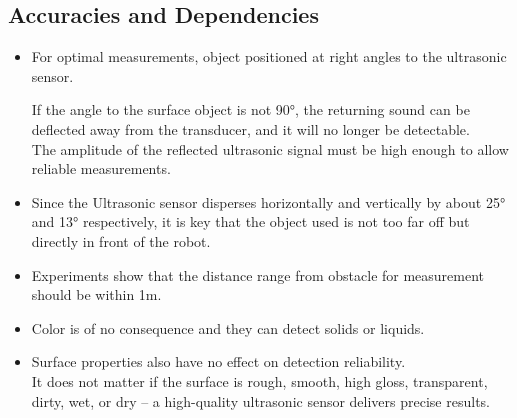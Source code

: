 \subsection*{\Large Accuracies and Dependencies}
\vspace{5mm}
    \begin{itemize}
        \item For optimal measurements, object positioned at right angles to the ultrasonic sensor.
        
        If the angle to the surface object is not 90°, the returning sound can be deflected away from the transducer, and it will no longer be detectable. \\
        The amplitude of the reflected ultrasonic signal must be high enough to allow reliable measurements. 
        \vspace{3mm}
        
        \item Since the Ultrasonic sensor disperses horizontally and vertically by about 25° and 13° respectively, it is key that the object used is not too far off but directly in front of the robot.
        \vspace{3mm}
        
        \item Experiments show that the distance range from obstacle for measurement should be within 1m.
        \vspace{3mm}
        
        \item Color is of no consequence and they can detect solids or liquids.
        \vspace{3mm}
        
        \item Surface properties also have no effect on detection reliability.\\
        It does not matter if the surface is rough, smooth, high gloss, transparent, dirty, wet, or dry – a high-quality ultrasonic sensor delivers precise results.

\end{itemize}
\newpage
